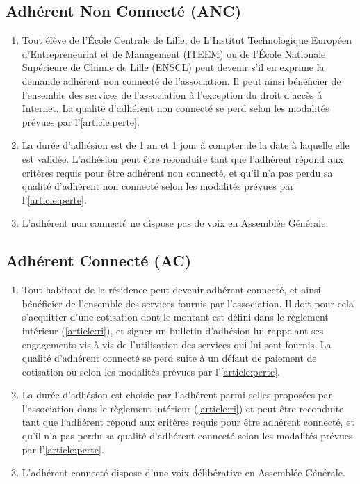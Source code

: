 \documentclass[12pt, a4paper]{article}
\begin{document}
\subsection{Adhérent Non Connecté (ANC)}

\begin{enumerate}
    \item Tout élève de l’École Centrale de Lille, de L’Institut Technologique Européen d’Entrepreneuriat et de Management (ITEEM) ou de l’École Nationale Supérieure de Chimie de Lille (ENSCL) peut devenir s’il en exprime la demande adhérent non connecté de l’association. Il peut ainsi bénéficier de l’ensemble des services de l’association à l’exception du droit d’accès à Internet. La qualité d’adhérent non connecté se perd selon les modalités prévues par l’\ref{article:perte}.
    \item La durée d’adhésion est de 1 an et 1 jour à compter de la date à laquelle elle est validée. L’adhésion peut être reconduite tant que l’adhérent répond aux critères requis pour être adhérent non connecté, et qu’il n’a pas perdu sa qualité d’adhérent non connecté selon les modalités prévues par l’\ref{article:perte}.
    \item L’adhérent non connecté ne dispose pas de voix en Assemblée Générale.
\end{enumerate}

\subsection{Adhérent Connecté (AC)}

\begin{enumerate}
    \item Tout habitant de la résidence peut devenir adhérent connecté, et ainsi bénéficier de l’ensemble des services fournis par l’association. Il doit pour cela s’acquitter d’une cotisation dont le montant est défini dans le règlement intérieur (\ref{article:ri}), et signer un bulletin d’adhésion lui rappelant ses engagements vis-à-vis de l’utilisation des services qui lui sont fournis. La qualité d’adhérent connecté se perd suite à un défaut de paiement de cotisation ou selon les modalités prévues par l’\ref{article:perte}.
    \item La durée d’adhésion est choisie par l’adhérent parmi celles proposées par l’association dans le règlement intérieur (\ref{article:ri}) et peut être reconduite tant que l’adhérent répond aux critères requis pour être adhérent connecté, et qu’il n’a pas perdu sa qualité d’adhérent connecté selon les modalités prévues par l’\ref{article:perte}.
    \item L’adhérent connecté dispose d’une voix délibérative en Assemblée Générale.
\end{enumerate}
\end{document}
